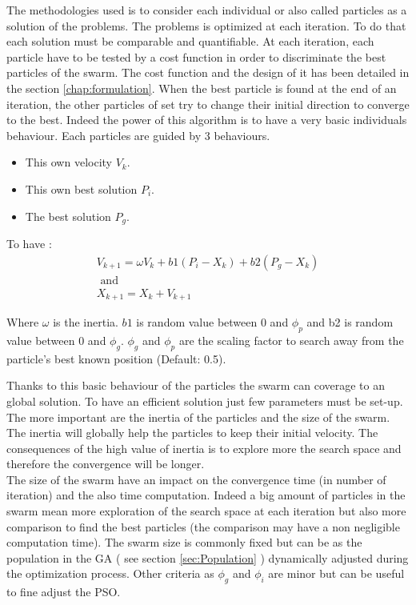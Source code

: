 The methodologies used is to consider each individual or also called particles as a solution of the problems. The problems is optimized at each iteration. To do that each solution must be comparable and quantifiable. At each iteration, each particle have to be tested by a cost function in order to discriminate the best particles of the swarm. The cost function and the design of it has been detailed in the section \ref{chap:formulation}.
When the best particle is found at the end of an iteration, the other particles of set try to change their initial direction to converge to the best. 
Indeed the power of this algorithm is to have a very basic individuals behaviour. 
Each particles are guided by 3 behaviours.
 \begin{itemize}
 \item  This own velocity $V_k$. 
 \item  This own best solution $P_i$.
 \item  The best solution $P_g$.
\end{itemize}  

To have :
\begin{equation} \label{eq:PSO}
\begin{split}
 V_{k+1}= \omega V_k +b1(P_i -X_k)+b2(P_g-X_k)
\\
\mbox{ and } \\ X_{k+1}=X_k+V_{k+1}
\end{split}
\end{equation}

Where $\omega$ is the inertia. $b1$ is random value between 0 and $\phi_p$ and b2 is random value between 0 and $\phi_g$. $\phi_g$ and $\phi_p$  are the scaling factor to search away from the particle’s best known position (Default: 0.5). 

Thanks to this basic behaviour of the particles the swarm can coverage to an global solution. 
To have an efficient  solution  just few parameters must be set-up.  
The more important are the inertia of the particles and the size of the swarm.\\
The inertia  will globally  help the particles to keep  their  initial velocity. The consequences of the high value of inertia is to explore more the search space and therefore the convergence will be longer. \\
The size of the swarm  have an impact on the  convergence time (in number of iteration) and the also time computation. Indeed a big amount of particles in the swarm  mean more exploration of the search space at each iteration but also more comparison to find the best particles (the comparison may have a non negligible computation time). 
The swarm size is commonly fixed but can be as the population in the GA ( see section \ref{sec:Population} ) dynamically adjusted during the optimization process. 
Other criteria as  $\phi_g$ and $\phi_i$ are minor but can be useful to fine adjust the PSO.

